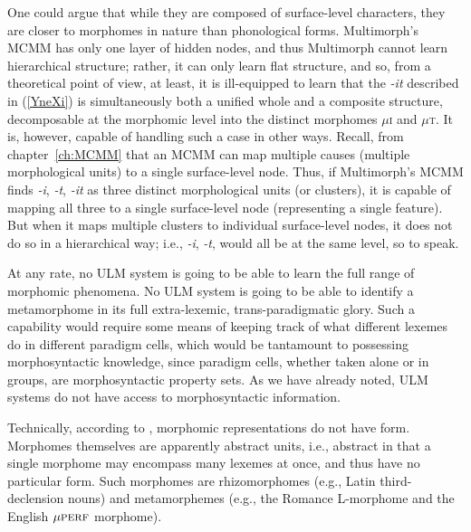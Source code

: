 One could argue that while they are composed of surface-level characters,
they are closer to morphomes in nature than phonological forms.
 Multimorph's \ac{MCMM} has only one layer of hidden nodes,
and thus Multimorph cannot learn hierarchical structure; rather, it can only learn 
flat structure, and so, from a theoretical point of view, at least, it is ill-equipped to learn
that the \textit{-it} described in (\ref{YneXi}) is simultaneously 
both a unified whole and a composite structure,
decomposable at the morphomic level into the distinct morphomes 
$\mu$\textsc{i} and $\mu$\textsc{t}.
It is, however, capable of handling such a case in other ways. 
Recall, from chapter~\ref{ch:MCMM} 
that an \ac{MCMM} can map multiple causes (multiple morphological units)
 to a single surface-level node. Thus, if Multimorph's \ac{MCMM} finds 
 \textit{-i}, \textit{-t}, \textit{-it} as three distinct
 morphological units (or clusters), it is capable of mapping all three 
 to a single surface-level node (representing a single feature). 
 But when it maps multiple clusters to individual surface-level nodes, 
 it does not do so in a hierarchical way; i.e., \textit{-i}, \textit{-t},  would
 all be at the same level, so to speak.

At any rate, no \ac{ULM} system is going to be able to learn the full range of morphomic
phenomena. No \ac{ULM} system is going to be able to identify a metamorphome in its full
 extra-lexemic, trans-paradigmatic glory. Such a capability would require some means
of keeping track of what different lexemes do in different paradigm cells, which would be tantamount
to possessing morphosyntactic knowledge, since paradigm cells, whether taken alone or in groups,
are morphosyntactic property sets. As we have already noted, \ac{ULM} systems do not
have access to morphosyntactic information.

	Technically, according to \cite{round:2011}, morphomic 
	representations do not have form. Morphomes
	themselves are apparently abstract units, i.e., abstract in that 
	a single morphome may encompass many lexemes at once, and thus
	have no particular form. Such morphomes are rhizomorphomes (e.g.,
	Latin third-declension nouns) and metamorphemes (e.g., the Romance L-morphome and the English
	${\mu}\textsc{perf}$ morphome).

